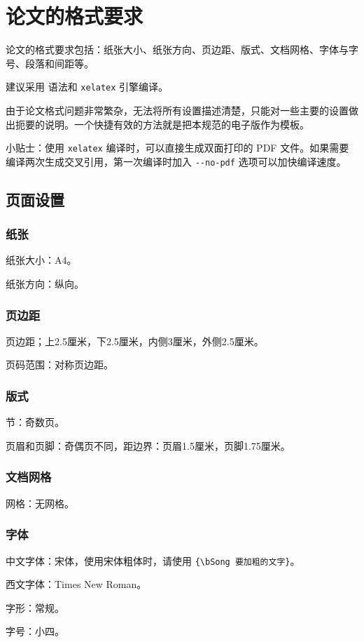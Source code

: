 \chapter{论文的格式要求}
\label{chap:formats}
\par 论文的格式要求包括：纸张大小、纸张方向、页边距、版式、文档网格、字体与字号、段落和间距等\cite{机器学习}。
\par 建议采用 \LaTeXe 语法和 \verb|xelatex| 引擎编译。
\par 由于论文格式问题非常繁杂，无法将所有设置描述清楚，只能对一些主要的设置做出扼要的说明。一个快捷有效的方法就是把本规范的电子版作为模板。
\par 小贴士：使用 \verb|xelatex| 编译时，可以直接生成双面打印的 PDF 文件。如果需要编译两次生成交叉引用，第一次编译时加入 \verb|--no-pdf| 选项可以加快编译速度。

\section{页面设置}
\subsection{纸张}
\par 纸张大小：A4。
\par 纸张方向：纵向。

\subsection{页边距}
\par 页边距；上2.5厘米，下2.5厘米，内侧3厘米，外侧2.5厘米。
\par 页码范围：对称页边距。

\subsection{版式}
\par 节：奇数页。
\par 页眉和页脚：奇偶页不同，距边界：页眉1.5厘米，页脚1.75厘米。

\subsection{文档网格}
\par 网格：无网格。

\subsection{字体}
\par 中文字体：宋体，使用{\bSong 宋体粗体}时，请使用 \verb|{\bSong 要加粗的文字}|。
\par 西文字体：Times New Roman。
\par 字形：常规。
\par 字号：小四。

